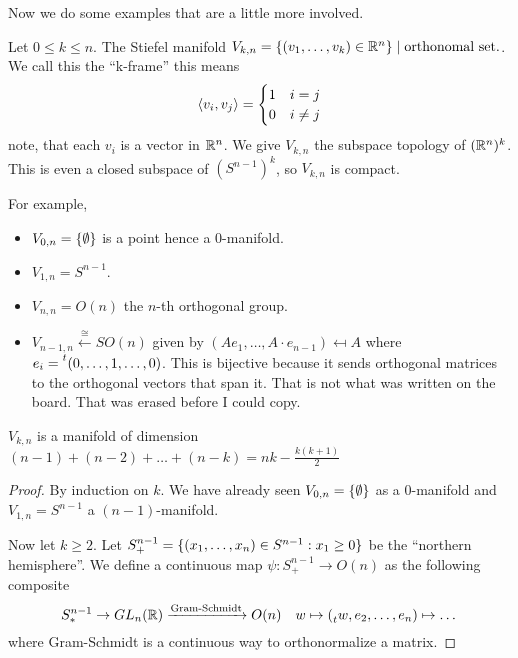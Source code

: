\documentclass[language=english]{TemplateLecture}
\begin{document}
Now we do some examples that are a little more involved.

\begin{example}
    Let \(0 \leq k \leq n\). The Stiefel manifold \(V_{k,n} = \{(v_1, \dots, v_k) \in \mathbb{R}^n\} \mid \text{orthonomal set.}\). We call this the \enquote{k-frame} this means
    \[\langle v_i, v_j\rangle = \begin{cases}
        1 & i = j \\
        0 & i \neq j
    \end{cases}\]
    note, that each \(v_i\) is a vector in \(\mathbb{R}^n\). We give \(V_{k,n}\) the subspace topology of \((\mathbb{R}^{n})^k\). This is even a closed subspace of \((S^{n-1})^k\), so \(V_{k,n}\) is compact.

    For example,
    \begin{itemize}
        \item \(V_{0,n} = \{\emptyset\}\) is a point hence a \(0\)-manifold.
        \item \(V_{1,n} = S^{n-1}\).
        \item \(V_{n,n} = O(n)\) the \(n\)-th orthogonal group.
        \item \(V_{n-1, n} \xleftarrow{\cong} SO(n)\) given by \((Ae_1, \dots, A\cdot e_{n-1}) \mapsfrom A\) where \(e_i = \prescript{t}{}{(0,\dots, 1, \dots, 0)}\). This is bijective because it sends orthogonal matrices to the orthogonal vectors that span it. That is not what was written on the board. That was erased before I could copy.
    \end{itemize}

    \begin{proposition}
        \(V_{k,n}\) is a manifold of dimension \((n-1) + (n-2) + \dots + (n-k) = nk - \frac{k(k+1)}{2}\)
    \end{proposition}
    \begin{proof}
        By induction on \(k\). We have already seen \(V_{0,n} = \{\emptyset\} \) as a \(0\)-manifold and \(V_{1,n} = S^{n-1}\) a \((n-1)\)-manifold.

        Now let \(k \geq 2\). Let \(S^{n-1}_+ = \{(x_1, \dots, x_n) \in S^{n-1} : x_1 \geq 0\}\) be the \enquote{northern hemisphere}. We define a continuous map \(\psi \colon S^{n-1}_+ \to O(n)\) as the following composite
        \[S^{n-1}_* \to GL_n(\mathbb{R}) \xrightarrow{\text{Gram-Schmidt}} O(n) \quad w \mapsto (\prescript{}{t}{w}, e_2, \dots, e_n) \mapsto \dots\]
        where Gram-Schmidt is a continuous way to orthonormalize a matrix.


\end{proof}
\end{example}
\end{document}
